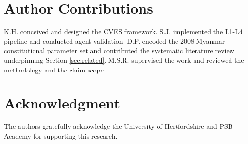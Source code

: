 \documentclass{ieeeaccess}
\newif\ifpendingvisible
\newcommand{\todo}[1]{%
  \ifpendingvisible\textcolor{red}{\textbf{[\MakeUppercase{#1}]}}\fi}
\begin{document}
\section*{Author Contributions}

K.H. conceived and designed the CVES framework. S.J. implemented the
L1-L4 pipeline and conducted agent validation. D.P. encoded the 2008
Myanmar constitutional parameter set and contributed the systematic
literature review underpinning Section \ref{sec:related}. M.S.R.
supervised the work and reviewed the methodology and the claim scope.

\section*{Acknowledgment}

The authors gratefully acknowledge the University of Hertfordshire and
PSB Academy for supporting this research.
\todo{PENDING: confirm with the supervising author whether the Stage-8
acknowledgment revisions constitute a byline change requiring the IEEE
Request for Byline Change form. Do not alter the Author Contributions
statement above in either direction without that determination.}




\EOD
\end{document}
